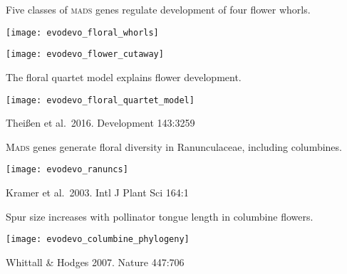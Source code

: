 \documentclass[t]{beamer}
\newcommand{\futuyma}[1]{%
	\ifthenelse{\isempty{#1}}%
	{Futuyma \& Kirkpatrick 2017, 4th ed.}%
	{Fig.~#1~Futuyma \& Kirkpatrick 2017, 4th ed.}%
}
\newcommand{\backskip}{\vspace{-0.5\baselineskip}}
\begin{document}
{
\begin{frame}[b]

\end{frame}
}

\begin{frame}{Five classes of \textsc{mads} genes regulate development of four flower whorls.}

\vspace{-\baselineskip}

\centering
\texttt{[image: evodevo\_floral\_whorls]}

\texttt{[image: evodevo\_flower\_cutaway]}

\end{frame}

\begin{frame}{The floral quartet model explains flower development.}

\backskip

\centering

\texttt{[image: evodevo\_floral\_quartet\_model]}

\tinyfill Theißen et al.~2016. Development 143:3259

\end{frame}

\begin{frame}{M\textsc{ads} genes generate floral diversity in Ranunculaceae, including columbines.}

\backskip

\centering

\texttt{[image: evodevo\_ranuncs]}

\tinyfill Kramer et al.~2003. Intl J Plant Sci 164:1  

\end{frame}

\begin{frame}{Spur size increases with pollinator tongue length in columbine flowers.}
\backskip

\centering

\texttt{[image: evodevo\_columbine\_phylogeny]}

\tinyfill Whittall \& Hodges 2007. Nature 447:706  

\end{frame}
\end{document}
